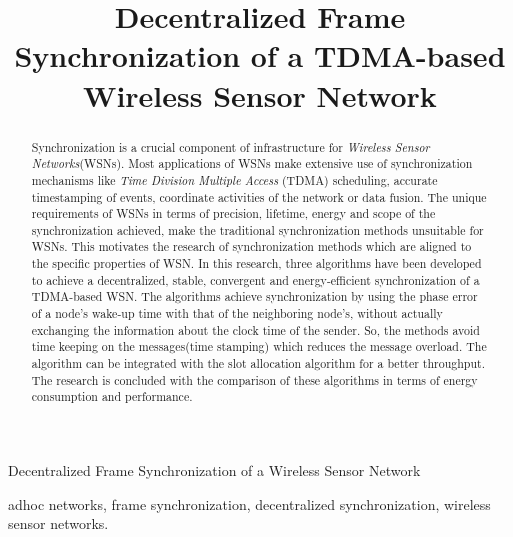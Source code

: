 \documentclass[journal]{IEEEtran}
\begin{document}
%
\title{Decentralized Frame Synchronization of a TDMA-based Wireless Sensor Network}

\author{\IEEEauthorblockN{}
}

{Decentralized Frame Synchronization of a Wireless Sensor Network}

\maketitle

\begin{abstract}
Synchronization is a crucial component of infrastructure for \textit{Wireless Sensor Networks}(WSNs). Most applications of WSNs
make extensive use of synchronization mechanisms like  \emph{Time Division Multiple Access} (TDMA) scheduling, accurate
timestamping of events, coordinate activities of the network or data fusion. The unique requirements of WSNs in terms of precision, lifetime, energy and scope of the synchronization achieved, make the traditional synchronization methods unsuitable for WSNs. This motivates the research of synchronization methods which are aligned to the specific properties of WSN. \newline In this research, three algorithms have been developed to achieve a decentralized, stable, convergent and energy-efficient synchronization of a TDMA-based WSN. The algorithms achieve synchronization by using the phase error of a node's wake-up time with that of the neighboring node's, without actually exchanging the information about the clock time of the sender. So, the methods avoid time keeping on the messages(time stamping) which reduces the message overload. The algorithm can be integrated with the slot allocation algorithm  for a better throughput. The research is concluded with the comparison of these algorithms in terms of energy consumption and performance.
\end{abstract}
\begin{IEEEkeywords}
adhoc networks, frame synchronization, decentralized synchronization, wireless sensor networks.
\end{IEEEkeywords}
\end{document}
